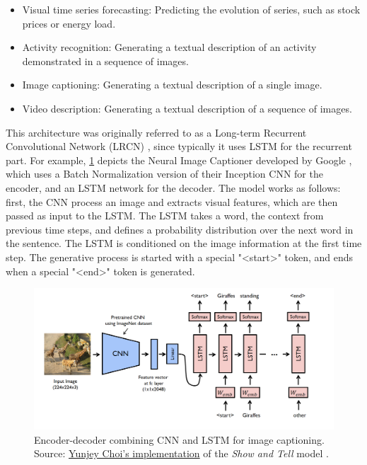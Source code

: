 \begin{itemize}
    \item Visual time series forecasting: Predicting the evolution of series, such as stock prices or energy load.
    \item Activity recognition: Generating a textual description of an activity demonstrated in a sequence of images.
    \item Image captioning: Generating a textual description of a single image.
    \item Video description: Generating a textual description of a sequence of images.
\end{itemize}

This architecture was originally referred to as a Long-term Recurrent Convolutional Network (LRCN) \citep{Donahue2015}, since typically it uses LSTM for the recurrent part. For example, \cref{fig:cnn-rnn} depicts the Neural Image Captioner developed by Google \citep{Vinyals2015}, which uses  a Batch Normalization version of their Inception CNN for the encoder, and an LSTM network for the decoder. The model works as follows: first, the CNN process an image and extracts visual features, which are then passed as input to the LSTM. The LSTM takes a word, the context from previous time steps, and defines a probability distribution over the next word in the sentence. The LSTM is conditioned on the image information at the first time step. The generative process is started with a special "<start>" token, and ends when a special "<end>" token is generated.

\begin{figure}[hpt]
	\centering
	\includegraphics[scale=0.3]{images/ch3/cnn-rnn.png}
	\caption{Encoder-decoder combining CNN and LSTM for image captioning. Source:  \href{https://github.com/yunjey/pytorch-tutorial/tree/master/tutorials/03-advanced/image_captioning}{Yunjey Choi's implementation} of the \textit{Show and Tell} model \citep{Vinyals2015}.}
	\label{fig:cnn-rnn}
\end{figure}

